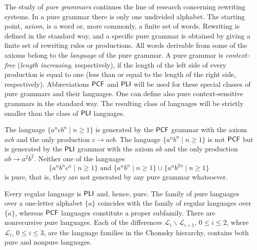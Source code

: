 The study of \emph{pure grammars} continues the line of research 
concerning rewriting systems. In a pure grammar there is only one undivided alphabet. 
The starting point, \emph{axiom}, is a word or, more commonly, a finite set 
of words. Rewriting is defined in the standard way, and a specific pure grammar is 
obtained by giving a finite set of rewriting rules or 
productions. All words derivable from some of the axioms belong to 
the \emph{language} of the pure grammar. A pure grammar is 
\emph{context-free} 
(\emph{length increasing}, respectively), if the 
length of the left side of every production is equal to one (less than or equal to the 
length of the right side, respectively). Abbreviations \index{$\PCF$}$\PCF$ and 
\index{$\PLI$}$\PLI$ will be used for these special classes of pure grammars and their 
languages. One can define also  pure 
context-sensitive grammars in the standard way. The resulting class of languages will 
be strictly smaller than the class of $\PLI$ languages.

The language $\{a^n c b^n \mid n \ge 1\}$ is generated by the $\PCF$ grammar
with the axiom $acb$ and the only production $c \to acb$. The language
$\{a^n b^n \mid n \ge 1\}$ is not $\PCF$ but is generated by the $\PLI$ grammar
with the axiom $ab$ and the only production $ab \to a^2 b^2$. Neither one
of the languages
$$\{a^n b^n c^n \mid n \ge 1\} \text{ and }
\{a^n b^n \mid n \ge 1\} \cup \{a^n b^{2n} \mid n \ge 1\}$$
is pure, that is, they are not generated by any pure grammar whatsoever.

Every regular language is $\PLI$ and, hence, pure. The family of pure languages
over a one-letter alphabet $\{a\}$ coincides with the family of 
regular languages over $\{a\}$, whereas $\PCF$ languages 
constitute a proper subfamily.
There are nonrecursive pure languages. Each of the differences
$\mathcal{L}_i \backslash \mathcal{L}_{i+1}$, $0 \le i \le 2$, where
$\mathcal{L}_i$, $0 \le i \le 3$, are the language families in the Chomsky
hierarchy, contains both pure and nonpure languages.


